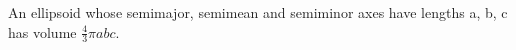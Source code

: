 An ellipsoid whose semimajor, semimean and semiminor axes have lengths a, b, c
has volume $ \frac{4}{3} \pi abc . $